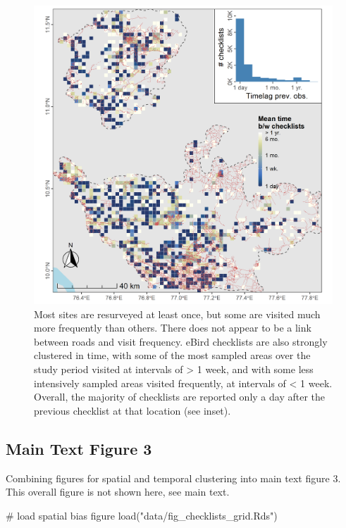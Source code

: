 \documentclass[
]{article}
\newenvironment{Shaded}{}{}
\newcommand{\CommentTok}[1]{\textcolor[rgb]{0.00,0.50,0.00}{#1}}
\newcommand{\KeywordTok}[1]{\textcolor[rgb]{0.00,0.00,1.00}{#1}}
\newcommand{\NormalTok}[1]{#1}
\newcommand{\StringTok}[1]{\textcolor[rgb]{0.00,0.50,0.50}{#1}}
\begin{document}
\begin{figure}
\centering
\includegraphics{figs/fig_temporal_bias.png}
\caption{Most sites are resurveyed at least once, but some are visited much more frequently than others. There does not appear to be a link between roads and visit frequency. eBird checklists are also strongly clustered in time, with some of the most sampled areas over the study period visited at intervals of \textgreater{} 1 week, and with some less intensively sampled areas visited frequently, at intervals of \textless{} 1 week. Overall, the majority of checklists are reported only a day after the previous checklist at that location (see inset).}
\end{figure}

\hypertarget{main-text-figure-3}{%
\subsection{Main Text Figure 3}\label{main-text-figure-3}}

Combining figures for spatial and temporal clustering into main text figure 3. This overall figure is not shown here, see main text.

\begin{Shaded}
\begin{Highlighting}[]
\CommentTok{# load spatial bias figure}
\KeywordTok{load}\NormalTok{(}\StringTok{"data/fig_checklists_grid.Rds"}\NormalTok{)}
\end{Highlighting}
\end{Shaded}
\end{document}
